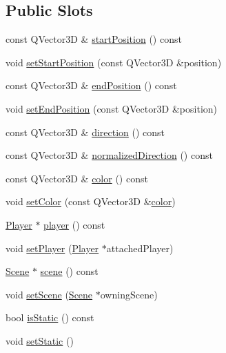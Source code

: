 \subsection*{Public Slots}
\begin{DoxyCompactItemize}
\item 
const Q\+Vector3\+D \& \hyperlink{class_light_ray_a70d3d18bbecdf54dc399df5112ca024a}{start\+Position} () const 
\item 
void \hyperlink{class_light_ray_a1db98f630b5a18bb297936fc5c8f25fb}{set\+Start\+Position} (const Q\+Vector3\+D \&position)
\item 
const Q\+Vector3\+D \& \hyperlink{class_light_ray_a13026c9fc18cf7fc2d53832223172f13}{end\+Position} () const 
\item 
void \hyperlink{class_light_ray_a5b9d55f5a6bed4b610f1bc294905dd64}{set\+End\+Position} (const Q\+Vector3\+D \&position)
\item 
const Q\+Vector3\+D \& \hyperlink{class_light_ray_af2c247c9b2cc33b4b18ead8e1b12c697}{direction} () const 
\item 
const Q\+Vector3\+D \& \hyperlink{class_light_ray_a1a0dfa514a6c350b78e20903d2fde5c4}{normalized\+Direction} () const 
\item 
const Q\+Vector3\+D \& \hyperlink{class_light_ray_ae816ba62186298d8900e4617034d1d66}{color} () const 
\item 
void \hyperlink{class_light_ray_a607addd328ae2b935d21e093ae15bcd4}{set\+Color} (const Q\+Vector3\+D \&\hyperlink{class_light_ray_ad03c134ce8b910618409f74d1267ff9b}{color})
\item 
\hyperlink{class_player}{Player} $\ast$ \hyperlink{class_light_ray_ab2e0d1d08c23a451b83907d61af4297a}{player} () const 
\item 
void \hyperlink{class_light_ray_a3720775f0e8d6c5a8041fd6a7b371dad}{set\+Player} (\hyperlink{class_player}{Player} $\ast$attached\+Player)
\item 
\hyperlink{class_scene}{Scene} $\ast$ \hyperlink{class_light_ray_a7ad5ff6f8863759c2183c95ba8914dfc}{scene} () const 
\item 
void \hyperlink{class_light_ray_a82577f82a77e84b81bd1b722a00bde54}{set\+Scene} (\hyperlink{class_scene}{Scene} $\ast$owning\+Scene)
\item 
bool \hyperlink{class_light_ray_a86e10593e7c2e3a4bbbbf817dd774c27}{is\+Static} () const 
\item 
void \hyperlink{class_light_ray_a6694333616a4d172f1c1bcb4ccbe1587}{set\+Static} ()
\item 

\end{DoxyCompactItemize}
